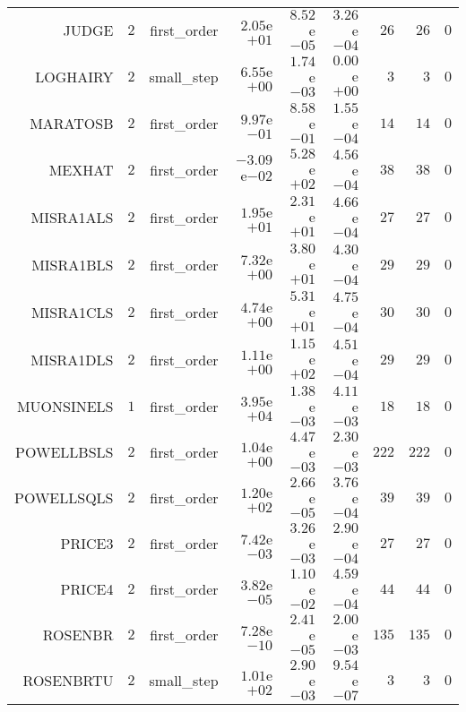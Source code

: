 \begin{longtable}{rrrrrrrrr}
JUDGE & \(     2\) & first\_order & \( 2.05\)e\(+01\) & \( 8.52\)e\(-05\) & \( 3.26\)e\(-04\) & \(    26\) & \(    26\) & \(     0\) \\
LOGHAIRY & \(     2\) & small\_step & \( 6.55\)e\(+00\) & \( 1.74\)e\(-03\) & \( 0.00\)e\(+00\) & \(     3\) & \(     3\) & \(     0\) \\
MARATOSB & \(     2\) & first\_order & \( 9.97\)e\(-01\) & \( 8.58\)e\(-01\) & \( 1.55\)e\(-04\) & \(    14\) & \(    14\) & \(     0\) \\
MEXHAT & \(     2\) & first\_order & \(-3.09\)e\(-02\) & \( 5.28\)e\(+02\) & \( 4.56\)e\(-04\) & \(    38\) & \(    38\) & \(     0\) \\
MISRA1ALS & \(     2\) & first\_order & \( 1.95\)e\(+01\) & \( 2.31\)e\(+01\) & \( 4.66\)e\(-04\) & \(    27\) & \(    27\) & \(     0\) \\
MISRA1BLS & \(     2\) & first\_order & \( 7.32\)e\(+00\) & \( 3.80\)e\(+01\) & \( 4.30\)e\(-04\) & \(    29\) & \(    29\) & \(     0\) \\
MISRA1CLS & \(     2\) & first\_order & \( 4.74\)e\(+00\) & \( 5.31\)e\(+01\) & \( 4.75\)e\(-04\) & \(    30\) & \(    30\) & \(     0\) \\
MISRA1DLS & \(     2\) & first\_order & \( 1.11\)e\(+00\) & \( 1.15\)e\(+02\) & \( 4.51\)e\(-04\) & \(    29\) & \(    29\) & \(     0\) \\
MUONSINELS & \(     1\) & first\_order & \( 3.95\)e\(+04\) & \( 1.38\)e\(-03\) & \( 4.11\)e\(-03\) & \(    18\) & \(    18\) & \(     0\) \\
POWELLBSLS & \(     2\) & first\_order & \( 1.04\)e\(+00\) & \( 4.47\)e\(-03\) & \( 2.30\)e\(-03\) & \(   222\) & \(   222\) & \(     0\) \\
POWELLSQLS & \(     2\) & first\_order & \( 1.20\)e\(+02\) & \( 2.66\)e\(-05\) & \( 3.76\)e\(-04\) & \(    39\) & \(    39\) & \(     0\) \\
PRICE3 & \(     2\) & first\_order & \( 7.42\)e\(-03\) & \( 3.26\)e\(-03\) & \( 2.90\)e\(-04\) & \(    27\) & \(    27\) & \(     0\) \\
PRICE4 & \(     2\) & first\_order & \( 3.82\)e\(-05\) & \( 1.10\)e\(-02\) & \( 4.59\)e\(-04\) & \(    44\) & \(    44\) & \(     0\) \\
ROSENBR & \(     2\) & first\_order & \( 7.28\)e\(-10\) & \( 2.41\)e\(-05\) & \( 2.00\)e\(-03\) & \(   135\) & \(   135\) & \(     0\) \\
ROSENBRTU & \(     2\) & small\_step & \( 1.01\)e\(+02\) & \( 2.90\)e\(-03\) & \( 9.54\)e\(-07\) & \(     3\) & \(     3\) & \(     0\) \\

\end{longtable}

